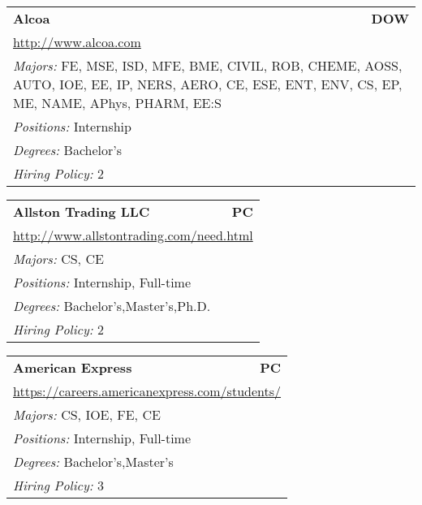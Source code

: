 \documentclass[twoside]{article}
\begin{document}
\begin{center}
\begin{multicols}{3}
\begin{FlushLeft}
\begin{minipage}{.9\columnwidth}
\end{minipage}
 
\begin{minipage}{.9\columnwidth}\begin{tabularx}{.95\columnwidth}{Xr}
                 {\Large\bf Alcoa} & {\Large\bf DOW}\\
    \multicolumn{2}{p{.95\columnwidth}}{\url{http://www.alcoa.com}}\\
    \multicolumn{2}{p{.95\columnwidth}}{\emph{Majors:} FE, MSE, ISD, MFE, BME, CIVIL, ROB, CHEME, AOSS, AUTO, IOE, EE, IP, NERS, AERO, CE, ESE, ENT, ENV, CS, EP, ME, NAME, APhys, PHARM, EE:S}\\
    \multicolumn{2}{p{.95\columnwidth}}{\emph{Positions:} Internship}\\
    \multicolumn{2}{p{.95\columnwidth}}{\emph{Degrees:} Bachelor's}\\
    \multicolumn{2}{p{.95\columnwidth}}{\emph{Hiring Policy:} 2}\\
    \end{tabularx}
    
\end{minipage}
 
\begin{minipage}{.9\columnwidth}\begin{tabularx}{.95\columnwidth}{Xr}
                 {\Large\bf Allston Trading LLC} & {\Large\bf PC}\\
    \multicolumn{2}{p{.95\columnwidth}}{\url{http://www.allstontrading.com/need.html}}\\
    \multicolumn{2}{p{.95\columnwidth}}{\emph{Majors:} CS, CE}\\
    \multicolumn{2}{p{.95\columnwidth}}{\emph{Positions:} Internship, Full-time}\\
    \multicolumn{2}{p{.95\columnwidth}}{\emph{Degrees:} Bachelor's,Master's,Ph.D.}\\
    \multicolumn{2}{p{.95\columnwidth}}{\emph{Hiring Policy:} 2}\\
    \end{tabularx}
    
\end{minipage}
 
\begin{minipage}{.9\columnwidth}\begin{tabularx}{.95\columnwidth}{Xr}
                 {\Large\bf American Express} & {\Large\bf PC}\\
    \multicolumn{2}{p{.95\columnwidth}}{\url{https://careers.americanexpress.com/students/}}\\
    \multicolumn{2}{p{.95\columnwidth}}{\emph{Majors:} CS, IOE, FE, CE}\\
    \multicolumn{2}{p{.95\columnwidth}}{\emph{Positions:} Internship, Full-time}\\
    \multicolumn{2}{p{.95\columnwidth}}{\emph{Degrees:} Bachelor's,Master's}\\
    \multicolumn{2}{p{.95\columnwidth}}{\emph{Hiring Policy:} 3}\\
    \end{tabularx}
    

\end{minipage}
\end{FlushLeft}
\end{multicols}
\end{center}
\end{document}
